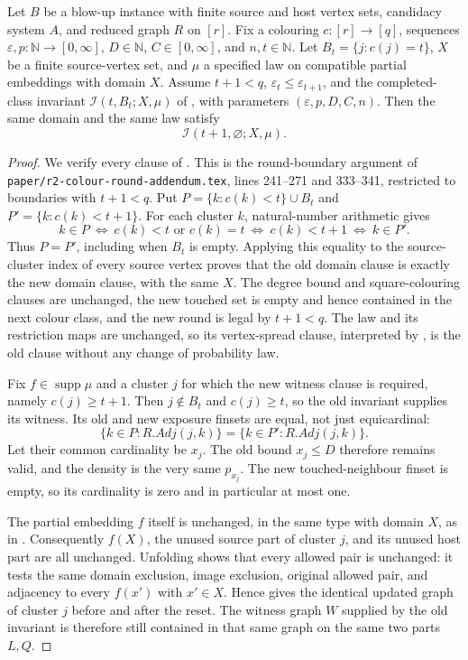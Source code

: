 \begin{lemma}
Let $B$ be a blow-up instance with finite source and host vertex sets,
candidacy system $A$, and reduced graph $R$ on $[r]$.  Fix a colouring
$c:[r]\to[q]$, sequences $\varepsilon,p:\mathbb N\to[0,\infty]$,
$D\in\mathbb N$, $C\in[0,\infty]$, and $n,t\in\mathbb N$.
Let $B_t=\{j:c(j)=t\}$, $X$ be a finite source-vertex set, and $\mu$ a
specified law on compatible partial embeddings with domain $X$.
Assume $t+1<q$, $\varepsilon_t\leq\varepsilon_{t+1}$, and the completed-class
invariant $\mathcal I(t,B_t;X,\mu)$ of , with
parameters $(\varepsilon,p,D,C,n)$.  Then the same domain and the same law
satisfy
\[
 \mathcal I(t+1,\varnothing;X,\mu).
\]
\end{lemma}
\begin{proof}
We verify every clause of .  This is the
round-boundary argument of \texttt{paper/r2-colour-round-addendum.tex},
lines 241--271 and 333--341, restricted to boundaries with $t+1<q$.
Put $P=\{k:c(k)<t\}\cup B_t$ and $P'=\{k:c(k)<t+1\}$.
For each cluster $k$, natural-number arithmetic gives
\[
 k\in P\ \Longleftrightarrow\ c(k)<t\text{ or }c(k)=t
       \ \Longleftrightarrow\ c(k)<t+1
       \ \Longleftrightarrow\ k\in P'.
\]
Thus $P=P'$, including when $B_t$ is empty.  Applying this equality to
the source-cluster index of every source vertex proves that the old domain
clause is exactly the new domain clause, with the same $X$.
The degree bound and square-colouring clauses are unchanged, the new touched
set is empty and hence contained in the next colour class, and the new
round is legal by $t+1<q$.  The law and its restriction maps are unchanged,
so its vertex-spread clause, interpreted by ,
is the old clause without any change of probability law.

Fix $f\in\operatorname{supp}\mu$ and a cluster $j$ for which the new witness
clause is required, namely $c(j)\geq t+1$.  Then $j\notin B_t$ and
$c(j)\geq t$, so the old invariant supplies its witness.  Its old and new
exposure finsets are equal, not just equicardinal:
\[
 \{k\in P:R.Adj(j,k)\}=\{k\in P':R.Adj(j,k)\}.
\]
Let their common cardinality be $x_j$.  The old bound $x_j\leq D$ therefore
remains valid, and the density is the very same $p_{x_j}$.
The new touched-neighbour finset is empty, so its cardinality is zero and
in particular at most one.

The partial embedding $f$ itself is unchanged, in the same type with domain
$X$, as in .  Consequently $f(X)$,
the unused source part of cluster $j$, and its unused host part are all
unchanged.  Unfolding  shows that every allowed
pair is unchanged: it tests the same domain exclusion, image exclusion,
original allowed pair, and adjacency to every $f(x')$ with $x'\in X$.
Hence  gives the identical updated graph
of cluster $j$ before and after the reset.  The witness graph $W$ supplied
by the old invariant is therefore still contained in that same graph on
the same two parts $L,Q$.


\end{proof}

